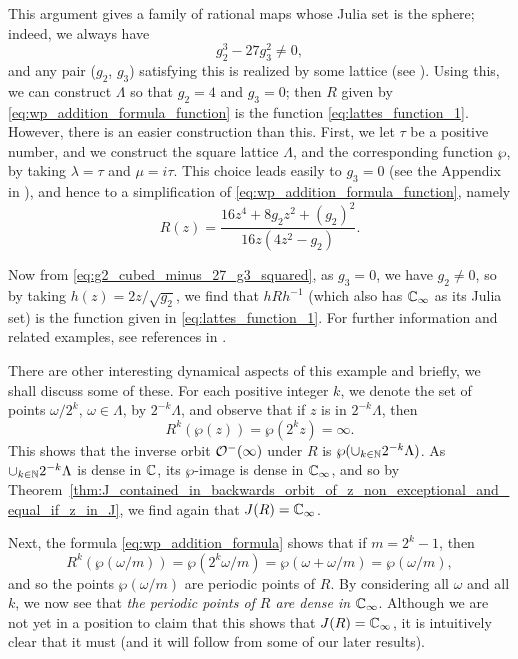 \begin{example}
    This argument gives a family of rational maps whose Julia set is the sphere;
    indeed, we always have
    \begin{equation}
        \label{eq:g2_cubed_minus_27_g3_squared}
        g_2^3 - 27 g_3^2 \neq 0,
    \end{equation}
    and any pair ($g_2$, $g_3$) satisfying this is realized by some lattice (see
    \cite[39]{Lang1987}). Using this, we can construct $\Lambda$ so that $g_2 =
    4$ and $g_3 = 0$; then $R$ given by \eqref{eq:wp_addition_formula_function}
    is the function \eqref{eq:lattes_function_1}. However, there is an easier
    construction than this. First, we let $\tau$ be a positive number, and we
    construct the square lattice $\Lambda$, and the corresponding function
    $\wp$, by taking $\lambda = \tau$ and $\mu = i\tau$. This choice leads
    easily to $g_3 = 0$ (see the Appendix in \cite[77--79]{Beardon1991}), and
    hence to a simplification of \eqref{eq:wp_addition_formula_function}, namely
    \begin{equation*}
        R(z) = \frac{16z^4 + 8g_2z^2 + (g_2)^2}{16z(4z^2 - g_2)}.
    \end{equation*}

    Now from \eqref{eq:g2_cubed_minus_27_g3_squared}, as $g_3 = 0$, we have $g_2
    \neq 0$, so by taking $h(z) = 2z/\sqrt{g_2}$, we find that $hRh^{-1}$ (which
    also has $\mathbb{C}_\infty$ as its Julia set) is the function given in
    \eqref{eq:lattes_function_1}. For further information and related examples,
    see references in \cite[75]{Beardon1991}.

    There are other interesting dynamical aspects of this example and briefly,
    we shall discuss some of these. For each positive integer $k$, we denote the
    set of points $\omega/2^k$, $\omega \in \Lambda$, by $2^{-k}\Lambda$, and
    observe that if $z$ is in $2^{-k}\Lambda$, then
    \begin{equation*}
        R^k(\wp(z)) = \wp(2^k z) = \infty.
    \end{equation*}
    This shows that the inverse orbit $\mathcal{O}^-(\infty)$ under $R$ is
    $\wp(\cup_{k \in \mathbb{N}} 2^{-k}\Lambda)$. As $\cup_{k \in \mathbb{N}} 2^{-k}\Lambda$ is
    dense in $\mathbb{C}$, its $\wp$-image is dense in $\mathbb{C}_\infty$, and so by
    Theorem~\ref{thm:J_contained_in_backwards_orbit_of_z_non_exceptional_and_equal_if_z_in_J},
    we find again that $J(R) = \mathbb{C}_\infty$.

    Next, the formula \eqref{eq:wp_addition_formula} shows that if $m = 2^k -
    1$, then
    \begin{equation*}
        R^k(\wp(\omega/m)) = \wp(2^k \omega/m) = \wp(\omega + \omega/m) = \wp(\omega/m),
    \end{equation*}
    and so the points $\wp(\omega/m)$ are periodic points of $R$. By considering
    all $\omega$ and all $k$, we now see that \emph{the periodic points of $R$
    are dense in $\mathbb{C}_\infty$}. Although we are not yet in a position to claim that
    this shows that $J(R) = \mathbb{C}_\infty$, it is intuitively clear that it must (and it
    will follow from some of our later results).
\end{example}

